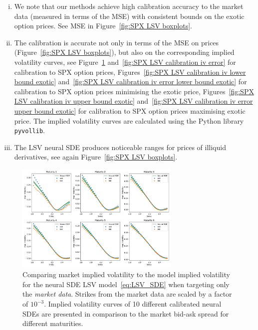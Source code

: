 \begin{enumerate}[i)]
\item We note that our methods achieve high calibration accuracy to the market data (measured in terms of the MSE) with consistent bounds on the exotic option prices. See MSE in Figure~\ref{fig:SPX LSV boxplots}.
\item The calibration is accurate not only in terms of the MSE on prices (Figure~\ref{fig:SPX LSV boxplots}), but also on the corresponding implied volatility curves, see Figure~\ref{fig:SPX LSV calibration iv} and~\ref{fig:SPX LSV calibration iv error} for calibration to SPX option prices, Figures~\ref{fig:SPX LSV calibration iv lower bound exotic} and~\ref{fig:SPX LSV calibration iv error lower bound exotic} for calibration to SPX option prices minimising the exotic price, Figures~\ref{fig:SPX LSV calibration iv upper bound exotic} and~\ref{fig:SPX LSV calibration iv error upper bound exotic} for calibration to SPX option prices maximising exotic price. The implied volatility curves are calculated using the Python library \texttt{pyvollib}.
\item The LSV neural SDE produces noticeable ranges for prices of illiquid derivatives, see again Figure~\ref{fig:SPX LSV boxplots}.  
\end{enumerate}


\begin{figure}[H]
  \centering 
	\includegraphics[clip, width=0.7\textwidth]{content/reschap1/Figures/figures_SPX/iv_nsde_unbounded.pdf}
  \caption{Comparing market implied volatility to the model implied volatility for the neural SDE LSV model~\eqref{eq:LSV_SDE} when targeting only the {\em market data}. Strikes from the market data are scaled by a factor of $10^{-3}$. Implied volatility curves of 10 different calibrated neural SDEs are presented in comparison to the market bid-ask spread for different maturities.
}
\label{fig:SPX LSV calibration iv}  
\end{figure}



